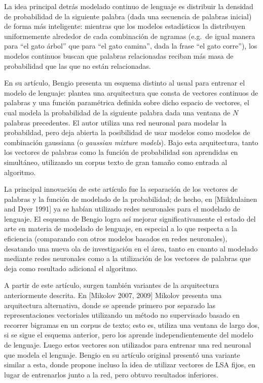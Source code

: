 La idea principal detrás modelado continuo de lenguaje es distribuir la densidad de probabilidad de
la siguiente palabra (dada una secuencia de palabras inicial) de forma más inteligente: mientras que
los modelos estadísticos la distribuyen uniformemente alrededor de cada combinación de ngramas
(e.g.\ de igual manera para ``el gato árbol'' que para ``el gato camina'', dada la frase ``el gato
corre''), los modelos continuos buscan que palabras relacionadas reciban más masa de probabilidad
que las que no están relacionadas.

En su artículo, Bengio presenta un esquema distinto al usual para entrenar el modelo de lenguaje:
plantea una arquitectura que consta de vectores continuos de palabras y una función paramétrica
definida sobre dicho espacio de vectores, el cual modela la probabilidad de la siguiente palabra
dada una ventana de $N$ palabras precedentes. El autor utiliza una red neuronal para modelar la
probabildad, pero deja abierta la posibilidad de usar modelos como modelos de combinación gaussiana
(o \textit{gaussian mixture models}). Bajo esta arquitectura, tanto los vectores de palabras como la
función de probabilidad son aprendidas en simultáneo, utilizando un corpus texto de gran tamaño como
entrada al algoritmo.

La principal innovación de este artículo fue la separación de los vectores de palabras y la función
de modelado de la probabilidad; de hecho, en [Miikkulainen and Dyer 1991] ya se habían utilizado
redes neuronales para el modelado de lenguaje. El esquema de Bengio logra así mejorar
significativamente el estado del arte en materia de modelado de lenguaje, en especial a lo que
respecta a la eficiencia (comparando con otros modelos basados en redes neuronales), desatando una
nueva ola de investigación en el área, tanto en cuanto al modelado mediante redes neuronales como a
la utilización de los vectores de palabras que deja como resultado adicional el algoritmo.


A partir de este artículo, surgen también variantes de la arquitectura anteriormente descrita. En
[Mikolov 2007, 2009] Mikolov presenta una arquitectura alternativa, donde se aprende primero por
separado las representaciones vectoriales utilizando un método no supervisado basado en recorrer
bigramas en un corpus de texto; esto es, utiliza una ventana de largo dos, si se sigue el esquema
anterior, pero los aprende independientemente del modelo de lenguaje. Luego estos vectores son
utilizados para entrenar una red neuronal que modela el lenguaje. Bengio en su artículo original
presentó una variante similar a esta, donde propone incluso la idea de utilizar vectores de LSA
fijos, en lugar de entrenarlos junto a la red, pero obtuvo resultados inferiores.


